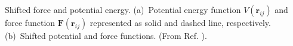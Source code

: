 \label{fig:Shifted-Potential-Energy}Shifted force and potential
energy. (a)~Potential energy function $V(\mathbf{r}_{ij})$ and force
function $\mathbf{F}(\mathbf{r}_{ij})$ represented as solid and dashed
line, respectively. (b)~Shifted potential and force functions. (From
Ref. \cite{allen:1989}).